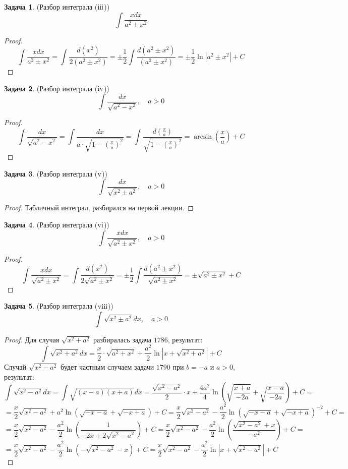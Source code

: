 \documentclass[12pt]{article}
\newcommand{\RN}[1]{%
	\textup{\uppercase\expandafter{\romannumeral#1}}%
}
\theoremstyle{definition}
\newtheorem{problem}{Задача}
\DeclareMathOperator{\dint}{\displaystyle\int}
\begin{document}
\begin{problem}(Разбор интеграла ($\RN{3}$)) 
	$$
		\dint \dfrac{xdx}{a^2 \pm x^2}
	$$
\end{problem}
\begin{proof}
	$$
		\dint \dfrac{xdx}{a^2 \pm x^2} = \dint \dfrac{ d(x^2)}{2(a^2 \pm x^2)} = \pm\dfrac{1}{2}\dint \dfrac{ d(a^2 \pm x^2)}{(a^2 \pm x^2)} = \pm \dfrac{1}{2}\ln{|a^2 \pm x^2|} + C
	$$
\end{proof}
\begin{problem}(Разбор интеграла ($\RN{4}$)) 
	$$
		\dint \dfrac{dx}{\sqrt{a^2 - x^2}}, \quad a > 0
	$$
\end{problem}
\begin{proof}
	$$
		\dint \dfrac{dx}{\sqrt{a^2 - x^2}} = \dint \dfrac{dx}{a{\cdot}\sqrt{1 - \left(\frac{x}{a}\right)^2}} = \dint \dfrac{d\left(\frac{x}{a}\right)}{\sqrt{1 - \left(\frac{x}{a}\right)^2}} = \arcsin{\left(\dfrac{x}{a}\right)} + C
	$$
\end{proof}
\begin{problem}(Разбор интеграла ($\RN{5}$)) 
	$$
		\dint \dfrac{dx}{\sqrt{x^2 \pm a^2}}, \quad a > 0
	$$
\end{problem}
\begin{proof}
	Табличный интеграл, разбирался на первой лекции.
\end{proof}
\begin{problem}(Разбор интеграла ($\RN{6}$)) 
	$$
		\dint \dfrac{xdx}{\sqrt{a^2 \pm x^2}}, \quad a > 0
	$$
\end{problem}
\begin{proof}
	$$
		\dint \dfrac{xdx}{\sqrt{a^2 \pm x^2}} = \dint \dfrac{d(x^2)}{2\sqrt{a^2 \pm x^2}} = \pm\dfrac{1}{2}\dint \dfrac{d(a^2 \pm x^2)}{\sqrt{a^2 \pm x^2}} = \pm \sqrt{a^2 \pm x^2} + C
	$$
\end{proof}
\begin{problem}(Разбор интеграла ($\RN{8}$)) 
	$$
		\dint \sqrt{x^2 \pm a^2}dx, \quad a > 0
	$$
\end{problem}
\begin{proof}
	Для случая $\sqrt{x^2 + a^2}$ разбиралась задача $1786$, результат:
	$$
		\dint \sqrt{x^2 + a^2}dx = \dfrac{x}{2}{\cdot}\sqrt{a^2 + x^2} + \dfrac{a^2}{2}\ln{\left|x + \sqrt{x^2 + a^2}\right|} +   C
	$$
	Случай $\sqrt{x^2 - a^2}$ будет частным случаем задачи $1790$ при $b = -a$ и $a > 0$, результат:
	$$
		\dint \sqrt{x^2 - a^2}dx = \dint \sqrt{(x-a)(x + a)}dx = \dfrac{\sqrt{x^2 - a^2}}{2}{\cdot}x + \dfrac{4a^2}{4}\ln{\left(\sqrt{\dfrac{x+a}{-2a}} + \sqrt{\dfrac{x-a}{-2a}}\right)} +C =
	$$
	$$
		=	\dfrac{x}{2}\sqrt{x^2 - a^2} + a^2\ln{\left(\sqrt{-x -a} + \sqrt{-x + a}\right)} + C = \dfrac{x}{2}\sqrt{x^2 - a^2} - \dfrac{a^2}{2}\ln{\left(\sqrt{-x-a} + \sqrt{-x +a}\right)^{-2}} + C =
	$$
	$$
		=	\dfrac{x}{2}\sqrt{x^2 - a^2} - \dfrac{a^2}{2}\ln{\left(\dfrac{1}{-2x + 2\sqrt{x^2 -a^2}}\right)} + C = \dfrac{x}{2}\sqrt{x^2 - a^2} - \dfrac{a^2}{2}\ln{\left(\dfrac{\sqrt{x^2 -a^2} + x}{-a^2}\right)} + C  =
	$$
	$$
		=\dfrac{x}{2}\sqrt{x^2 - a^2} - \dfrac{a^2}{2}\ln{\left(-\sqrt{x^2 -a^2} - x\right)} + C = \dfrac{x}{2}\sqrt{x^2 - a^2} - \dfrac{a^2}{2}\ln{\left|x +\sqrt{x^2 -a^2} \right|} + C
	$$
\end{proof}
\end{document}
